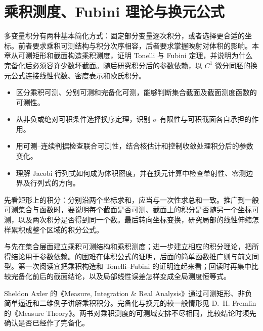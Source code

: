 \chapter{乘积测度、Fubini 理论与换元公式}
\label{b1:ch:07}
\begin{chapterabstract}
多变量积分有两种基本简化方式：固定部分变量逐次积分，或者选择更合适的坐标。前者要求乘积可测结构与积分次序相容，后者要求掌握映射对体积的影响。本章从可测矩形和截面构造乘积测度，证明 Tonelli 与 Fubini 定理，并说明为什么完备化后必须容许少数坏截面。随后研究积分后的参数依赖，以 \(C^1\) 微分同胚的换元公式连接线性代数、密度表示和欧氏积分。
\end{chapterabstract}

\begin{learninggoals}
\begin{itemize}
  \item \label{b1:item:07-goal-structure}区分乘积可测、分别可测和完备化可测，能够判断集合截面及截面测度函数的可测性。
  \item \label{b1:item:07-goal-integration}从非负或绝对可积条件选择换序定理，识别 \(\sigma\)-有限性与可积截面各自承担的作用。
  \item \label{b1:item:07-goal-parameter}用可测--连续判据检查联合可测性，结合核估计和控制收敛处理积分后的参数变化。
  \item \label{b1:item:07-goal-change}理解 Jacobi 行列式如何成为体积密度，并在换元计算中检查单射性、零测边界及行列式的方向。
\end{itemize}
\end{learninggoals}

先看矩形上的积分：分别沿两个坐标求和，应当与一次性求总和一致。推广到一般可测集合与函数时，要说明每个截面是否可测、截面上的积分是否随另一个坐标可测，以及两次积分是否得到同一个数。最后转向坐标变换，研究局部的线性伸缩怎样累积成整个区域的积分公式。

\ProseParagraphBreak

与先在集合层面建立乘积可测结构和乘积测度；进一步建立相应的积分理论，把所得结论用于参数依赖。的困难在体积公式的证明，后面的简单函数推广则与前文同型。第一次阅读宜把乘积构造和 Tonelli--Fubini 的证明连起来看；回读时再集中比较完备化前后的截面结论，以及局部线性误差怎样变成全局测度恒等式。

\ProseParagraphBreak

Sheldon Axler 的《Measure, Integration \& Real Analysis》\cite[Chapter 5]{Axler2020Measure}通过可测矩形、非负简单逼近和二维例子讲解乘积积分。完备化与换元的较一般情形见 D.~H. Fremlin 的《Measure Theory》\cite[Volume 2, \S\S252 and 263]{Fremlin2016Measure}。两书对乘积测度的可测域安排不尽相同，比较结论时须先确认是否已经作了完备化。

